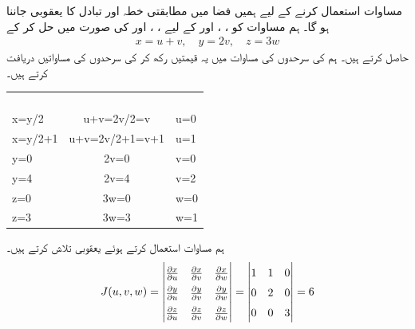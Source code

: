 مساوات   استعمال کرنے کے لیے ہمیں    فضا میں  مطابقتی خطہ  اور تبادل کا یعقوبی جاننا ہو گا۔ ہم مساوات  کو ،  ، اور  کے لیے ، ،  اور  کی صورت میں حل کر کے 
\begin{align}\label{مساوات_بالکثرت_نئے_متغیرات}
x=u+v,\quad y=2v,\quad z=3w
\end{align}
حاصل کرتے ہیں۔ ہم  کی سرحدوں کی مساوات میں  یہ قیمتیں  رکھ کر    کی سرحدوں کی مساواتیں دریافت کرتے ہیں۔
\begin{center}
\begin{tabular}{LCL}
\toprule
\begin{minipage}{2cm}\\   \end{minipage}&
\begin{minipage}{2cm}\\   \end{minipage}&
\begin{minipage}{2cm}\\   \end{minipage}\\
\midrule
x=y/2&u+v=2v/2=v&u=0\\
x=y/2+1&u+v=2v/2+1=v+1&u=1\\
y=0&2v=0&v=0\\
y=4&2v=4&v=2\\
z=0&3w=0&w=0\\
z=3&3w=3&w=1\\
\bottomrule
\end{tabular}
\end{center}
ہم مساوات  استعمال کرتے ہوئے یعقوبی تلاش کرتے ہیں۔
\begin{align*}
\renewcommand{\arraystretch}{1.5}
J(u,v,w)=\begin{vmatrix}
\frac{\partial x}{\partial u} &\frac{\partial x}{\partial v}&\frac{\partial x}{\partial w}\\
\frac{\partial y}{\partial u}&\frac{\partial y}{\partial v}&\frac{\partial y}{\partial w}\\
\frac{\partial z}{\partial u}&\frac{\partial z}{\partial v}&\frac{\partial z}{\partial w}
\end{vmatrix}=\begin{vmatrix}
1&1&0\\
0&2&0\\
0&0&3
\end{vmatrix}=6
\end{align*}
